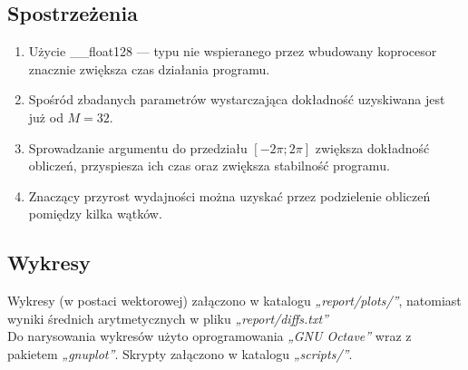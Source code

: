\documentclass[12pt]{article}
\begin{document}
\subsection{Spostrzeżenia}
\begin{enumerate}
    \item Użycie \_\_float128 — typu nie wspieranego przez wbudowany koprocesor znacznie zwiększa czas działania programu.
    \item Spośród zbadanych parametrów wystarczająca dokładność uzyskiwana jest już od $M = 32$.
    \item Sprowadzanie argumentu do przedziału $[-2\pi;2\pi]$ zwiększa dokładność obliczeń, przyspiesza ich czas oraz zwiększa stabilność programu.
    \item Znaczący przyrost wydajności można uzyskać przez podzielenie obliczeń pomiędzy kilka wątków.
\end{enumerate}

\subsection{Wykresy}
Wykresy (w postaci wektorowej) załączono w katalogu \textit{„report/plots/”}, natomiast wyniki średnich arytmetycznych w pliku \textit{„report/diffs.txt”}\\
Do narysowania wykresów użyto oprogramowania \textit{„GNU Octave”} wraz z pakietem \textit{„gnuplot”}. Skrypty załączono w katalogu \textit{„scripts/”}.
\end{document}
